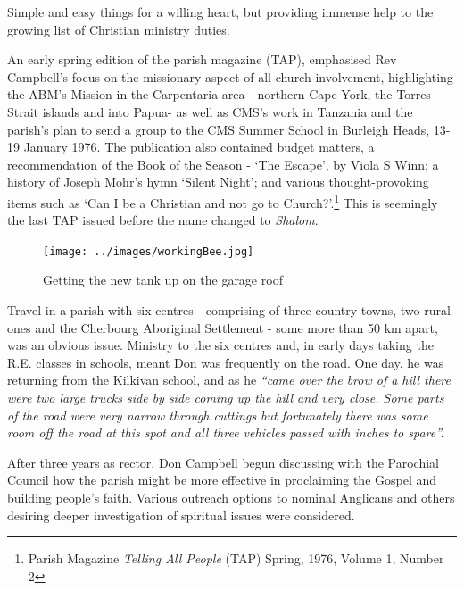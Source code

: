 Simple and easy things for a willing heart, but providing immense help to the growing list of Christian ministry duties.



An early spring edition of the parish magazine (TAP), emphasised Rev Campbell's focus on the missionary aspect of all church involvement, highlighting the ABM's Mission in the Carpentaria area - northern Cape York, the Torres Strait islands and into Papua- as well as CMS's work in Tanzania and the parish's plan to send a group to the CMS Summer School in Burleigh Heads, 13-19 January 1976. The publication also contained budget matters, a recommendation of the Book of the Season - `The Escape', by Viola S Winn; a history of Joseph Mohr's hymn `Silent Night'; and various thought-provoking items such as `Can I be a Christian and not go to Church?'.\footnote{Parish Magazine \emph{Telling All People} (TAP) Spring, 1976, Volume 1, Number 2} This is seemingly the last TAP issued before the name changed to \emph{Shalom}.








\begin{figure}[!htb]
\begin{center}
\texttt{[image: ../images/workingBee.jpg]}
\caption{Getting the new tank up on the garage roof}
\end{center}
\end{figure}




Travel in a parish with six centres - comprising of three country towns, two rural ones and the Cherbourg Aboriginal Settlement - some more than 50 km apart, was an obvious issue. Ministry to the six centres and, in early days taking the R.E. classes in schools, meant Don was frequently on the road. One day, he was returning from the Kilkivan school, and as he \emph{``came over the brow of a hill there were two large trucks side by side coming up the hill and very close. Some parts of the road were very narrow through cuttings but fortunately there was some room off the road at this spot and all three vehicles passed with inches to spare''.}



After three years as rector, Don Campbell begun discussing with the Parochial Council how the parish might be more effective in proclaiming the Gospel and building people's faith. Various outreach options to nominal Anglicans and others desiring deeper investigation of spiritual issues were considered.




